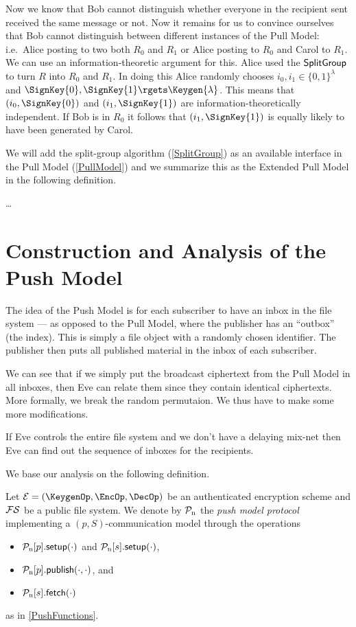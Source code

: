 Now we know that Bob cannot distinguish whether everyone in the recipient sent 
received the same message or not.
Now it remains for us to convince ourselves that Bob cannot distinguish between
different instances of the Pull Model: i.e.\ Alice posting to two both \(R_0\) 
and \(R_1\) or Alice posting to \(R_0\) and Carol to \(R_1\).
We can use an information-theoretic argument for this.
Alice used the \(\operatorname{\mathsf{SplitGroup}}\) to turn \(R\) into \(R_0\) and \(R_1\).
In doing this Alice randomly chooses \(i_0, i_1\in \{0, 1\}^\lambda\) and 
\(\SignKey{0}, \SignKey{1}\rgets \Keygen{\lambda}\).
This means that \((i_0, \SignKey{0})\) and \((i_1, \SignKey{1})\) are 
information-theoretically independent.
If Bob is in \(R_0\) it follows that \((i_1, \SignKey{1})\) is equally likely 
to have been generated by Carol.

We will add the split-group algorithm (\cref{SplitGroup}) as an available 
interface in the Pull Model (\cref{PullModel}) and we summarize this as the 
Extended Pull Model in the following definition.

\begin{definition}
  \dots
\end{definition}


\section{Construction and Analysis of the Push Model}
\label{PushAnalysis}

The idea of the Push Model is for each subscriber to have an inbox in the file 
system --- as opposed to the Pull Model, where the publisher has an 
\enquote{outbox} (the index).
This is simply a file object with a randomly chosen identifier.
The publisher then puts all published material in the inbox of each subscriber.

We can see that if we simply put the broadcast ciphertext from the Pull Model 
in all inboxes, then Eve can relate them since they contain identical 
ciphertexts.
More formally, we break the random permutaion.
We thus have to make some more modifications.

If Eve controls the entire file system and we don't have a delaying mix-net 
then Eve can find out the sequence of inboxes for the recipients.

We base our analysis on the following definition.

\begin{definition}\label{PushModel}
  Let \(\mathcal{E} = (\KeygenOp, \EncOp, \DecOp)\) be an authenticated 
  encryption scheme and \(\operatorname{\mathcal{FS}}\) be a public file system.
  We denote by \(\operatorname{\mathcal{P}_n}\) the \emph{push model protocol} implementing a \((p, 
    S)\)-communication model through the operations
  \begin{itemize}
    \item \(\pnsetup{p}[\cdot]\) and \(\pnsetup{s}[\cdot]\),
    \item \(\pnpub{p}[\cdot][\cdot]\), and
    \item \(\pnget{s}[\cdot]\)
  \end{itemize}
  as in \cref{PushFunctions}.
\end{definition}


